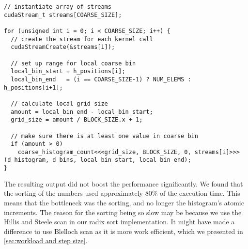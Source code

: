 \begin{lstlisting}[caption={Using streams to invoke kernels concurrently}, label={lst:coarse histo streams}]
// instantiate array of streams
cudaStream_t streams[COARSE_SIZE];

for (unsigned int i = 0; i < COARSE_SIZE; i++) {
  // create the stream for each kernel call
  cudaStreamCreate(&streams[i]);

  // set up range for local coarse bin
  local_bin_start = h_positions[i];
  local_bin_end   = (i == COARSE_SIZE-1) ? NUM_ELEMS : h_positions[i+1];

  // calculate local grid size
  amount = local_bin_end - local_bin_start;
  grid_size = amount / BLOCK_SIZE.x + 1;

  // make sure there is at least one value in coarse bin
  if (amount > 0)
    coarse_histogram_count<<<grid_size, BLOCK_SIZE, 0, streams[i]>>>(d_histogram, d_bins, local_bin_start, local_bin_end);
}
\end{lstlisting}

The resulting output did not boost the performance significantly.
We found that the sorting of the numbers used approximately $80\%$ of the execution time.
This means that the bottleneck was the sorting, and no longer the histogram's atomic increments.
The reason for the sorting being so slow may be because we use the Hillis and Steele scan in our radix sort implementation.
It might have made a difference to use Blelloch scan as it is more work efficient, which we presented in \cref{sec:workload and step size}.
